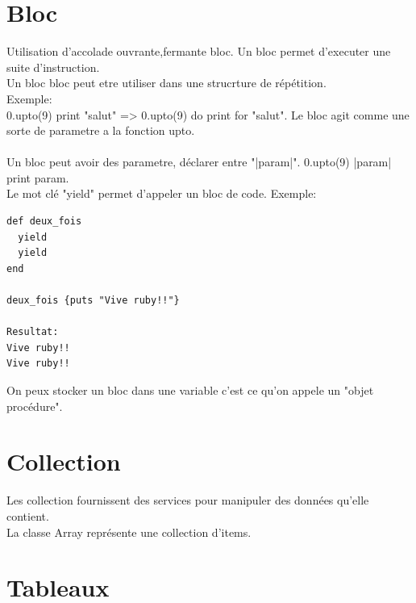 \documentclass[a4paper,12pt,openany]{book}
\begin{document}

\section{Bloc}

Utilisation d'accolade ouvrante,fermante {bloc}. Un bloc permet d'executer une suite d'instruction.\\
Un bloc bloc peut etre utiliser dans une strucrture de répétition.\\
Exemple:\\
0.upto(9) {print "salut"}  => 0.upto(9) do print for "salut". Le bloc agit comme une sorte de parametre a la fonction upto.\\
\\
Un bloc peut avoir des parametre, déclarer entre "|param|". 0.upto(9) {|param| print param}. \\
Le mot clé "yield" permet d'appeler un bloc de code. Exemple:\\
\begin{verbatim}
def deux_fois
  yield
  yield
end

deux_fois {puts "Vive ruby!!"}

Resultat:
Vive ruby!!
Vive ruby!!
\end{verbatim}

On peux stocker un bloc dans une variable c'est ce qu'on appele un "objet procédure".\\




\section{Collection}

Les collection fournissent des services pour manipuler des données qu'elle contient.\\
La classe Array représente une collection d'items.\\



\section{Tableaux}
\end{document}
